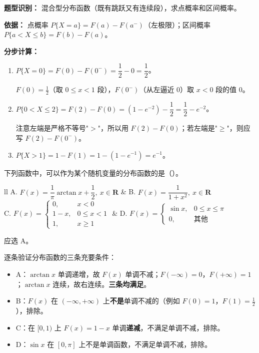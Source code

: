 ﻿\documentclass[lang=cn,11pt]{elegantbook}
\begin{document}
\begin{solution}
\textbf{题型识别：} 混合型分布函数（既有跳跃又有连续段），求点概率和区间概率。

\textbf{依据：} 点概率 $P\{X=a\} = F(a) - F(a^-)$（左极限）；区间概率 $P\{a < X \leqslant b\} = F(b) - F(a)$。

\textbf{分步计算：}
\begin{enumerate}
    \item \(P\{X = 0\} = F(0) - F(0^-) = \dfrac{1}{2} - 0 = \dfrac{1}{2}\)。

    $F(0) = \frac{1}{2}$（取 $0 \le x < 1$ 段），$F(0^-)$（从左逼近 $0$）取 $x<0$ 段的值 $0$。

    \item \(P\{0 < X \le 2\} = F(2) - F(0) = (1 - e^{-2}) - \dfrac{1}{2} = \dfrac{1}{2} - e^{-2}\)。

    注意左端是严格不等号"$>$"，所以用 $F(2) - F(0)$；若左端是"$\geqslant$"，则应写 $F(2) - F(0^-)$。

    \item \(P\{X > 1\} = 1 - F(1) = 1 - (1 - e^{-1}) = e^{-1}\)。
\end{enumerate}
\end{solution}

\begin{exercise}\label{exer:2-2}
下列函数中，可以作为某个随机变量的分布函数的是（\quad）。\par
\begin{tabular}{ll}
A. \(F(x) = \dfrac{1}{\pi}\arctan x + \dfrac{1}{2},\ x \in \mathbf{R}\) & B. \(F(x) = \dfrac{1}{1+x^2},\ x \in \mathbf{R}\) \\[6pt]
C. \(F(x) = \begin{cases} 0, & x < 0 \\ 1-x, & 0 \le x < 1 \\ 1, & x \ge 1 \end{cases}\) & D. \(F(x) = \begin{cases} \sin x, & 0 \le x \le \pi \\ 0, & \text{其他} \end{cases}\)
\end{tabular}
\end{exercise}

\begin{solution}
应选 A。

逐条验证分布函数的三条充要条件：
\begin{itemize}
    \item A：\(\arctan x\) 单调递增，故 \(F(x)\) 单调不减；\(F(-\infty)=0\)，\(F(+\infty)=1\)；\(\arctan x\) 连续，故右连续。\textbf{三条均满足}。
    \item B：\(F(x)\) 在 \((-\infty,+\infty)\) 上\textbf{不是}单调不减的（例如 \(F(0)=1\)，\(F(1)=\frac{1}{2}\)），排除。
    \item C：在 \([0,1)\) 上 \(F(x)=1-x\) 单调\textbf{递减}，不满足单调不减，排除。
    \item D：\(\sin x\) 在 \([0,\pi]\) 上不是单调函数，不满足单调不减，排除。
\end{itemize}
\end{solution}
\end{document}
